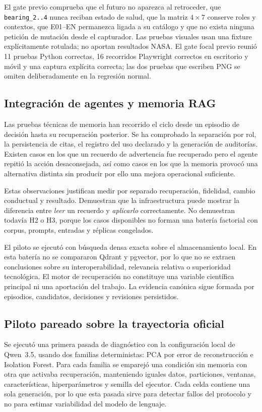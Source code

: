 El gate previo comprueba que el futuro no aparezca al retroceder, que
\texttt{bearing\_2..4} nunca reciban estado de salud, que la matriz
$4\times7$ conserve roles y contextos, que E01--EN permanezca ligada a su catálogo
y que no exista ninguna petición de mutación desde el capturador. Las pruebas
visuales usan una fixture explícitamente rotulada; no aportan resultados NASA.
El gate focal previo reunió 11 pruebas Python correctas, 16 recorridos
Playwright correctos en escritorio y móvil y una captura explícita correcta;
las dos pruebas que escriben PNG se omiten deliberadamente en la regresión
normal.

\subsection{Integración de agentes y memoria RAG}

Las pruebas técnicas de memoria han recorrido el ciclo desde un episodio de
decisión hasta su recuperación posterior. Se ha comprobado la separación por
rol, la persistencia de citas, el registro del uso declarado y la generación de
auditorías. Existen casos en los que un recuerdo de advertencia fue recuperado
pero el agente repitió la acción desaconsejada, así como casos en los que la
memoria provocó una alternativa distinta sin producir por ello una mejora
operacional suficiente.

Estas observaciones justifican medir por separado recuperación, fidelidad,
cambio conductual y resultado. Demuestran que la infraestructura puede mostrar
la diferencia entre \emph{leer} un recuerdo y \emph{aplicarlo} correctamente.
No demuestran todavía H2 o H3, porque los casos disponibles no forman una
batería factorial con corpus, prompts, entradas y réplicas congelados.

El piloto se ejecutó con búsqueda densa exacta sobre el almacenamiento local.
En esta batería no se compararon Qdrant y pgvector, por lo que no se extraen
conclusiones sobre su interoperabilidad, relevancia relativa o superioridad
tecnológica. El motor de recuperación no constituye una variable científica
principal ni una aportación del trabajo. La evidencia canónica sigue formada
por episodios, candidatos, decisiones y revisiones persistidos.

\subsection{Piloto pareado sobre la trayectoria oficial}

Se ejecutó una primera pasada de diagnóstico con la configuración local de
Qwen~3.5, usando dos familias deterministas: PCA por error de reconstrucción e
Isolation Forest. Para cada familia se emparejó una condición sin memoria con
otra que activaba recuperación, manteniendo iguales datos, particiones,
ventanas, características, hiperparámetros y semilla del ejecutor. Cada celda
contiene una sola generación, por lo que esta pasada sirve para detectar fallos
del protocolo y no para estimar variabilidad del modelo de lenguaje.

